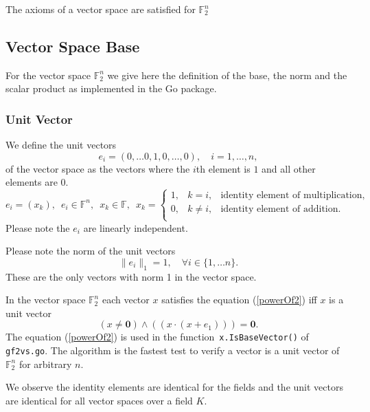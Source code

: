 \documentclass[a4paper]{article}
\newcommand{\BF}{\mathbb{F}}
\newcommand{\0}{\mathbf{0}}
\newcommand{\1}{\mathbf{1}}
\begin{document}
The axioms of a vector space are satisfied for $\BF_2^n$

\subsection{Vector Space Base}
For the vector space $\BF_2^n$ we give here the definition of the base, the norm and the scalar product as  implemented in the Go package.

\subsubsection{Unit Vector}
We define the unit vectors
\begin{equation}
e_i = (0, \dots 0, 1, 0, \dots, 0), \quad i = 1, \dots, n,
\end{equation}
of the vector space as the vectors
where the $i$th element is $1$ and all other elements are $0$.
\begin{equation}
e_i = (x_k),
\enspace e_i \in \BF^n,
\enspace x_k \in \BF,
\enspace x_k = \left\{
\begin{array}{lll}
1, & k = i, & \text{identity element of multiplication},  \\
0, & k \ne i, & \text{identity element of addition}. \\
\end{array}
\right.
\end{equation}
Please note the $e_i$ are linearly independent.

Please note the norm of the unit vectors 
\begin{equation}
\| e_i \|_1 = 1, \quad \forall i \in \{1, \dots n \}.
\label{normUnitVector}
\end{equation}
These are the only vectors with norm 1 in the vector space.

In the vector space $\BF_2^n$ each vector $x$ satisfies the equation (\ref{powerOf2})
iff $x$ is a unit vector 
\cite{Anderson2011, Warren2013}
\begin{equation}
	(x \ne \0) \wedge ((x \cdot (x + e_1))) = \0.
	\label{powerOf2}
\end{equation}
The equation (\ref{powerOf2}) is used in the function~\texttt{x.IsBaseVector()} of \texttt{gf2vs.go}.
The algorithm is the fastest test to verify a vector is a unit vector of $\BF_2^n$ for arbitrary $n$.

We observe the identity elements are identical for the fields and the unit vectors are
identical for all vector spaces over a field $K$.
\end{document}
